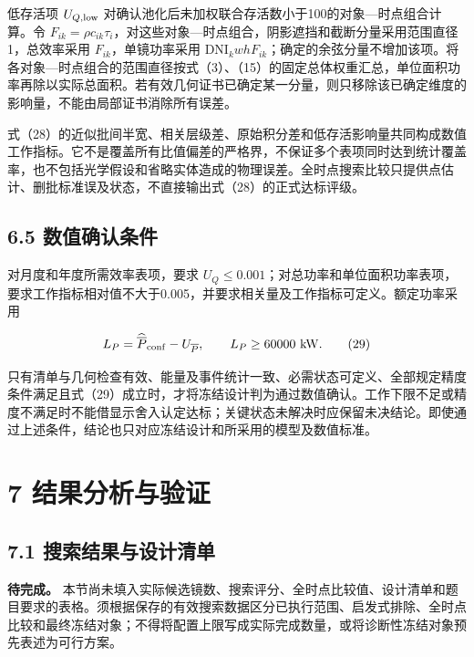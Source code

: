 \documentclass[UTF8,fontset=windows,zihao=-4]{ctexart}
\begin{document}
低存活项 \(U_{Q,\rm low}\) 对确认池化后未加权联合存活数小于100的对象—时点组合计算。令 \(F_{ik}=\rho c_{ik}\tau_i\)，对这些对象—时点组合，阴影遮挡和截断分量采用范围直径1，总效率采用 \(F_{ik}\)，单镜功率采用 \(\mathrm{DNI}_kwhF_{ik}\)；确定的余弦分量不增加该项。将各对象—时点组合的范围直径按式（3）、（15）的固定总体权重汇总，单位面积功率再除以实际总面积。若有效几何证书已确定某一分量，则只移除该已确定维度的影响量，不能由局部证书消除所有误差。

式（28）的近似批间半宽、相关层级差、原始积分差和低存活影响量共同构成数值工作指标。它不是覆盖所有比值偏差的严格界，不保证多个表项同时达到统计覆盖率，也不包括光学假设和省略实体造成的物理误差。全时点搜索比较只提供点估计、删批标准误及状态，不直接输出式（28）的正式达标评级。

\subsection*{6.5 数值确认条件}

\par\noindent\begin{minipage}{\linewidth}
对月度和年度所需效率表项，要求 \(U_Q\le0.001\)；对总功率和单位面积功率表项，要求工作指标相对值不大于0.005，并要求相关量及工作指标可定义。额定功率采用

\[
L_P=\widehat{\overline P}_{\rm conf}-U_{\overline P},
\qquad L_P\ge60000\ \mathrm{kW}.
\tag{29}
\]
\end{minipage}\par

只有清单与几何检查有效、能量及事件统计一致、必需状态可定义、全部规定精度条件满足且式（29）成立时，才将冻结设计判为通过数值确认。工作下限不足或精度不满足时不能借显示舍入认定达标；关键状态未解决时应保留未决结论。即使通过上述条件，结论也只对应冻结设计和所采用的模型及数值标准。

\section*{7 结果分析与验证}

\subsection*{7.1 搜索结果与设计清单}

\textbf{待完成。} 本节尚未填入实际候选镜数、搜索评分、全时点比较值、设计清单和题目要求的表格。须根据保存的有效搜索数据区分已执行范围、启发式排除、全时点比较和最终冻结对象；不得将配置上限写成实际完成数量，或将诊断性冻结对象预先表述为可行方案。
\end{document}
